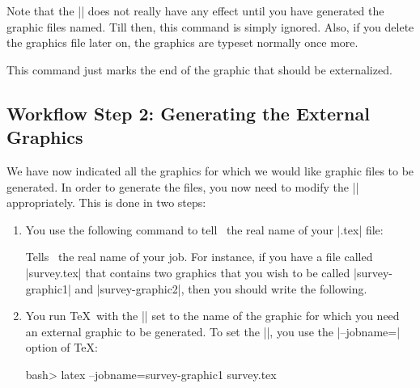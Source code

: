 \begin{command}{\beginpgfgraphicnamed{}}
  Note that the |\beginpgfgraphicnamed| does not really have any
  effect until you have generated the graphic files named. Till then,
  this command is simply ignored. Also, if you delete the graphics
  file later on, the graphics are typeset normally once more.
\end{command}

\begin{command}{\endpgfgraphicnamed}
  This command just marks the end of the graphic that should be
  externalized.
\end{command}


\subsection{Workflow Step 2: Generating the External Graphics}

We have now indicated all the graphics for which we would like graphic
files to be generated. In order to generate the files, you now need to
modify the |\jobname| appropriately. This is done in two steps:

\begin{enumerate}
\item You use the following command to tell \pgfname\ the real name of
  your |.tex| file:
  \begin{command}{\pgfrealjobname{}}
    Tells \pgfname\ the real name of your job. For instance, if you
    have a file called |survey.tex| that contains two graphics that
    you wish to be called |survey-graphic1| and |survey-graphic2|,
    then you should write the following.
  \end{command}
\item  You run \TeX\ with the |\jobname| set to the name of
the graphic for which you need an external graphic to be generated.
To set the |\jobname|, you use the |--jobname=| option of \TeX:

\begin{codeexample}
bash> latex --jobname=survey-graphic1 survey.tex
\end{codeexample}
\end{enumerate}

